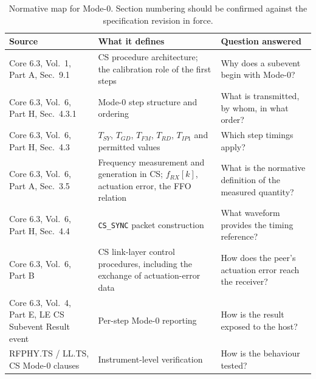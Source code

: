 \documentclass[11pt,a4paper]{article}
\newcommand{\Tsy}{T_{SY}}
\newcommand{\Tgd}{T_{GD}}
\newcommand{\Tfm}{T_{FM}}
\newcommand{\Trd}{T_{RD}}
\newcommand{\Tipone}{T_{IP1}}
\newcommand{\code}[1]{\texttt{\small #1}}
\begin{document}
\begin{table}[h]
\caption{Normative map for Mode-0. Section numbering should be confirmed against the specification
revision in force.}
\label{tab:normmap}
\centering\small
\begin{tabular}{@{}L{42mm}L{51mm}L{51mm}@{}}
\toprule
Source & What it defines & Question answered \\
\midrule
Core 6.3, Vol.\ 1, Part A, Sec.\ 9.1 & CS procedure architecture; the calibration role of the first steps & Why does a subevent begin with Mode-0? \\
Core 6.3, Vol.\ 6, Part H, Sec.\ 4.3.1 & Mode-0 step structure and ordering & What is transmitted, by whom, in what order? \\
Core 6.3, Vol.\ 6, Part H, Sec.\ 4.3 & $\Tsy$, $\Tgd$, $\Tfm$, $\Trd$, $\Tipone$ and permitted values & Which step timings apply? \\
Core 6.3, Vol.\ 6, Part A, Sec.\ 3.5 & Frequency measurement and generation in CS; $f_{RX}[k]$, actuation error, the FFO relation & What is the normative definition of the measured quantity? \\
Core 6.3, Vol.\ 6, Part H, Sec.\ 4.4 & \code{CS\_SYNC} packet construction & What waveform provides the timing reference? \\
Core 6.3, Vol.\ 6, Part B & CS link-layer control procedures, including the exchange of actuation-error data & How does the peer's actuation error reach the receiver? \\
Core 6.3, Vol.\ 4, Part E, LE CS Subevent Result event & Per-step Mode-0 reporting & How is the result exposed to the host? \\
RFPHY.TS / LL.TS, CS Mode-0 clauses & Instrument-level verification & How is the behaviour tested? \\
\bottomrule
\end{tabular}
\end{table}
\end{document}
